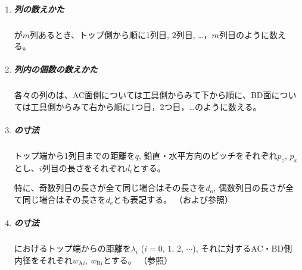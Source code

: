 \begin{tcolorbox}[title={\expandafterindex{ひょうき（\yomiDimple）@表記（\nameDimple）}\nameDimple に関する表記法}, fonttitle=\gtfamily\bfseries, breakable, enhanced jigsaw]
\begin{enumerate}[label=\sarrow]
\item
\subparagraph*{列の数えかた}
\Dimple が$m$列あるとき、トップ側から順に1列目, 2列目, …，$m$列目のように数える。

\item
\subparagraph*{列内の個数の数えかた}
各々の列の\DimpleNum は、AC面側については工具側からみて下から順に、BD面については工具側からみて右から順に1つ目，2つ目，…のように数える。

\item
\subparagraph*{\Dimple の寸法}
トップ端から1列目までの距離を$q$, 鉛直・水平方向のピッチをそれぞれ$p_z$, $p_x$とし、$i$列目の長さをそれぞれ$d_i$とする。

特に、奇数列目の長さが全て同じ場合はその長さを$d_\mathrm o$, 偶数列目の長さが全て同じ場合はその長さを$d_\mathrm e$とも表記する。
（および参照）

\item
\subparagraph*{\IDTaperTable の寸法}
\IDTaperTable におけるトップ端からの距離を$\lambda_i$ ($i = 0$, $1$, $2$, $\cdots$), それに対するAC・BD側内径をそれぞれ$w_{\mathrm Ai}$, $w_{\mathrm Bi}$とする。
（参照）


\end{enumerate}
\end{tcolorbox}

